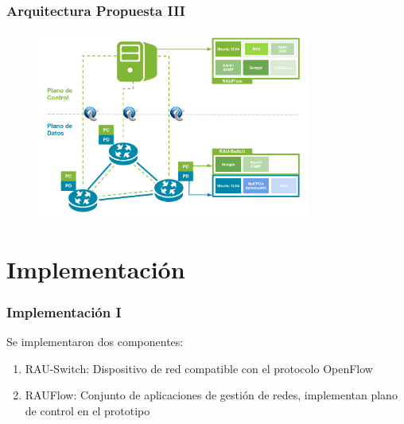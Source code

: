 \documentclass{beamer}
\begin{document}
\begin{frame}
\frametitle{Arquitectura Propuesta III} 

\begin{figure}[H]
\centering
\includegraphics[width=0.80\textwidth]{imagenes/arquitecturapropuesta1.png}
\end{figure}

\end{frame}


\section{Implementaci\'on} 
\frame{\tableofcontents[currentsection]}

\begin{frame}
\frametitle{Implementaci\'on I} 

Se implementaron dos componentes:

\begin{enumerate}
\item RAU-Switch: Dispositivo de red compatible con el protocolo OpenFlow
\item RAUFlow: Conjunto de aplicaciones de gesti\'on de redes, implementan plano de control en el prototipo
\end{enumerate}
\end{frame}
\end{document}
